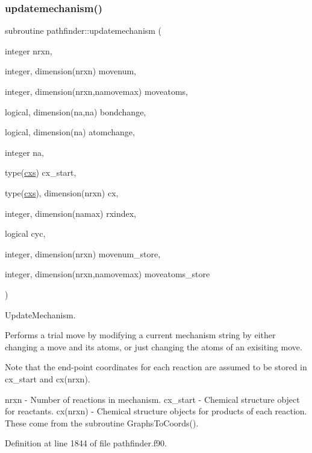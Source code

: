 \subsubsection{\texorpdfstring{updatemechanism()}{updatemechanism()}}
{\footnotesize\ttfamily subroutine pathfinder\+::updatemechanism (\begin{DoxyParamCaption}\item[{integer}]{nrxn,  }\item[{integer, dimension(nrxn)}]{movenum,  }\item[{integer, dimension(nrxn,namovemax)}]{moveatoms,  }\item[{logical, dimension(na,na)}]{bondchange,  }\item[{logical, dimension(na)}]{atomchange,  }\item[{integer}]{na,  }\item[{type(\mbox{\hyperlink{structchemstr_1_1cxs}{cxs}})}]{cx\+\_\+start,  }\item[{type(\mbox{\hyperlink{structchemstr_1_1cxs}{cxs}}), dimension(nrxn)}]{cx,  }\item[{integer, dimension(namax)}]{rxindex,  }\item[{logical}]{cyc,  }\item[{integer, dimension(nrxn)}]{movenum\+\_\+store,  }\item[{integer, dimension(nrxn,namovemax)}]{moveatoms\+\_\+store }\end{DoxyParamCaption})}



Update\+Mechanism. 

Performs a trial move by modifying a current mechanism string by either changing a move and its atoms, or just changing the atoms of an exisiting move.

Note that the end-\/point coordinates for each reaction are assumed to be stored in cx\+\_\+start and cx(nrxn).

nrxn -\/ Number of reactions in mechanism. cx\+\_\+start -\/ Chemical structure object for reactants. cx(nrxn) -\/ Chemical structure objects for products of each reaction. These come from the subroutine Graphs\+To\+Coords(). 

Definition at line 1844 of file pathfinder.\+f90.

\mbox{\label{namespacepathfinder_afbc92aeaed8e180333ae25bda3b93026}} 

